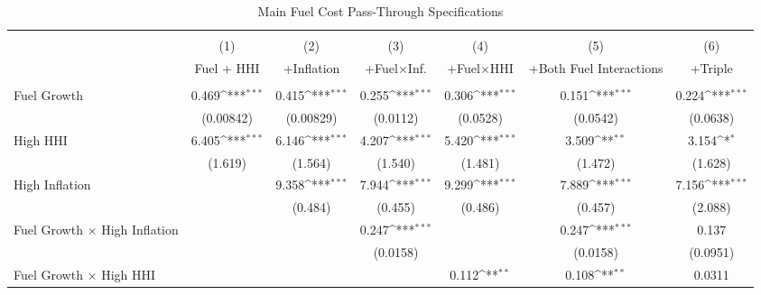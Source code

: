 \begin{table}
\centering
\caption{Main Fuel Cost Pass-Through Specifications}
\label{tab:main\_passthrough}
\scriptsize
\setlength{\tabcolsep}{2pt}
\renewcommand{\arraystretch}{0.9}
\def\sym#1{\ifmmode^{#1}\else\(^{#1}\)\fi}
\begin{tabular}{l*{6}{c}}
\\[-1.8ex]\hline
\hline \\[-1.8ex]
                    &\multicolumn{1}{c}{(1)}&\multicolumn{1}{c}{(2)}&\multicolumn{1}{c}{(3)}&\multicolumn{1}{c}{(4)}&\multicolumn{1}{c}{(5)}&\multicolumn{1}{c}{(6)}\\
                    &\multicolumn{1}{c}{Fuel + HHI}&\multicolumn{1}{c}{+Inflation}&\multicolumn{1}{c}{+Fuel$\times$Inf.}&\multicolumn{1}{c}{+Fuel$\times$HHI}&\multicolumn{1}{c}{+Both Fuel Interactions}&\multicolumn{1}{c}{+Triple}\\
\hline \\[-1.8ex]
Fuel Growth         &       0.469\sym{***}&       0.415\sym{***}&       0.255\sym{***}&       0.306\sym{***}&       0.151\sym{***}&       0.224\sym{***}\\
                    &   (0.00842)         &   (0.00829)         &    (0.0112)         &    (0.0528)         &    (0.0542)         &    (0.0638)         \\
High HHI            &       6.405\sym{***}&       6.146\sym{***}&       4.207\sym{***}&       5.420\sym{***}&       3.509\sym{**} &       3.154\sym{*}  \\
                    &     (1.619)         &     (1.564)         &     (1.540)         &     (1.481)         &     (1.472)         &     (1.628)         \\
High Inflation      &                     &       9.358\sym{***}&       7.944\sym{***}&       9.299\sym{***}&       7.889\sym{***}&       7.156\sym{***}\\
                    &                     &     (0.484)         &     (0.455)         &     (0.486)         &     (0.457)         &     (2.088)         \\
Fuel Growth $\times$ High Inflation&                     &                     &       0.247\sym{***}&                     &       0.247\sym{***}&       0.137         \\
                    &                     &                     &    (0.0158)         &                     &    (0.0158)         &    (0.0951)         \\
Fuel Growth $\times$ High HHI&                     &                     &                     &       0.112\sym{**} &       0.108\sym{**} &      0.0311         \\

\end{tabular}
\end{table}
